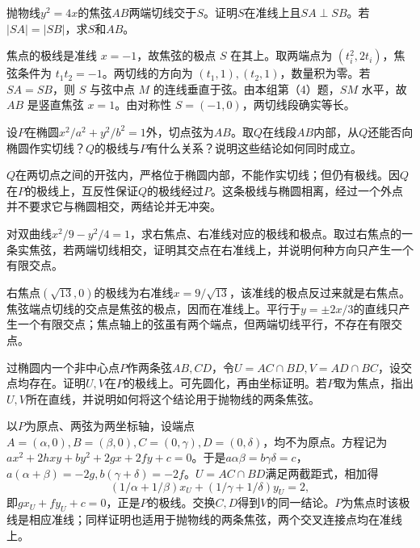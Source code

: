 抛物线\(y^2=4x\)的焦弦\(AB\)两端切线交于\(S\)。证明\(S\)在准线上且\(SA\perp SB\)。若\(|SA|=|SB|\)，求\(S\)和\(AB\)。
\par
\solutionanswer
焦点的极线是准线 \(x=-1\)，故焦弦的极点 \(S\) 在其上。取两端点为 \((t_i^2,2t_i)\)，焦弦条件为 \(t_1t_2=-1\)。两切线的方向为 \((t_1,1),(t_2,1)\)，数量积为零。若 \(SA=SB\)，则 \(S\) 与弦中点 \(M\) 的连线垂直于弦。由本组第（4）题，\(SM\) 水平，故 \(AB\) 是竖直焦弦 \(x=1\)。由对称性 \(S=(-1,0)\)，两切线段确实等长。


设\(P\)在椭圆\(x^2/a^2+y^2/b^2=1\)外，切点弦为\(AB\)。取\(Q\)在线段\(AB\)内部，从\(Q\)还能否向椭圆作实切线？\(Q\)的极线与\(P\)有什么关系？说明这些结论如何同时成立。
\par
\solutionanswer
\(Q\)在两切点之间的开弦内，严格位于椭圆内部，不能作实切线；但仍有极线。因\(Q\)在\(P\)的极线上，互反性保证\(Q\)的极线经过\(P\)。这条极线与椭圆相离，经过一个外点并不要求它与椭圆相交，两结论并无冲突。


对双曲线\(x^2/9-y^2/4=1\)，求右焦点、右准线对应的极线和极点。取过右焦点的一条实焦弦，若两端切线相交，证明其交点在右准线上，并说明何种方向只产生一个有限交点。
\par
\solutionanswer
右焦点\((\sqrt{13},0)\)的极线为右准线\(x=9/\sqrt{13}\)，该准线的极点反过来就是右焦点。焦弦端点切线的交点是焦弦的极点，因而在准线上。平行于\(y=\pm2x/3\)的直线只产生一个有限交点；焦点轴上的弦虽有两个端点，但两端切线平行，不存在有限交点。


过椭圆内一个非中心点\(P\)作两条弦\(AB,CD\)，令\(U=AC\cap BD,V=AD\cap BC\)，设交点均存在。证明\(U,V\)在\(P\)的极线上。可先圆化，再由坐标证明。若\(P\)取为焦点，指出\(U,V\)所在直线，并说明如何将这个结论用于抛物线的两条焦弦。
\par
\solutionanswer
以\(P\)为原点、两弦为两坐标轴，设端点\(A=(\alpha,0),B=(\beta,0),C=(0,\gamma),D=(0,\delta)\)，均不为原点。方程记为\(ax^2+2hxy+by^2+2gx+2fy+c=0\)。于是\(a\alpha\beta=b\gamma\delta=c\)，\(a(\alpha+\beta)=-2g,b(\gamma+\delta)=-2f\)。\(U=AC\cap BD\)满足两截距式，相加得
\[
(1/\alpha+1/\beta)x_U+(1/\gamma+1/\delta)y_U=2,
\]
即\(gx_U+fy_U+c=0\)，正是\(P\)的极线。交换\(C,D\)得到\(V\)的同一结论。\(P\)为焦点时该极线是相应准线；同样证明也适用于抛物线的两条焦弦，两个交叉连接点均在准线上。
\par
